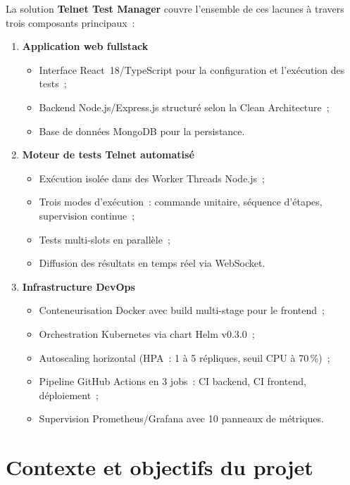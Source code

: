 La solution \textbf{Telnet Test Manager} couvre l'ensemble de ces
lacunes à travers trois composants principaux~:

\begin{enumerate}
  \item \textbf{Application web fullstack}
    \begin{itemize}
      \item Interface React~18/TypeScript pour la configuration et
            l'exécution des tests~;
      \item Backend Node.js/Express.js structuré selon la Clean
            Architecture~;
      \item Base de données MongoDB pour la persistance.
    \end{itemize}

  \item \textbf{Moteur de tests Telnet automatisé}
    \begin{itemize}
      \item Exécution isolée dans des Worker Threads Node.js~;
      \item Trois modes d'exécution~: commande unitaire, séquence
            d'étapes, supervision continue~;
      \item Tests multi-slots en parallèle~;
      \item Diffusion des résultats en temps réel via WebSocket.
    \end{itemize}

  \item \textbf{Infrastructure DevOps}
    \begin{itemize}
      \item Conteneurisation Docker avec build multi-stage pour
            le frontend~;
      \item Orchestration Kubernetes via chart Helm v0.3.0~;
      \item Autoscaling horizontal (HPA~: 1 à 5 répliques, seuil
            CPU à 70\,\%)~;
      \item Pipeline GitHub Actions en 3 jobs~: CI backend, CI
            frontend, déploiement~;
      \item Supervision Prometheus/Grafana avec 10 panneaux de
            métriques.
    \end{itemize}
\end{enumerate}

\section{Contexte et objectifs du projet}

